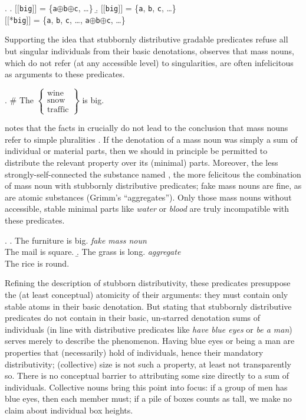 \documentclass[linguex]{sp}
\newcommand{\sem}[1]{\mbox{$[\![$#1$]\!]$}}
\renewcommand{\tt}{\texttt}
\newcommand{\op}{$\oplus$}
\begin{document}
\ex. \a. \sem{\tt{big}} = \{\tt{a}\op\tt{b}\op\tt{c}, \ldots\}
\b. \sem{\tt{big}} = \{\tt{a}, \tt{b}, \tt{c}, \ldots\}\\
\sem{*\tt{big}} = \{\tt{a}, \tt{b}, \tt{c}, \ldots, \tt{a}\op\tt{b}\op\tt{c}, \ldots\}

Supporting the idea that stubbornly distributive gradable predicates refuse all but singular individuals from their basic denotations, \cite{schwarzschild2011} observes that mass nouns, which do not refer (at any accessible level) to singularities, are often infelicitous as arguments to these predicates.

\ex. \# The $\left\{\begin{array}{l}\text{wine}\\ \text{snow}\\ \text{traffic}\end{array}\right\}$ is big.

\citeauthor{schwarzschild2011} notes that  the facts in \Last crucially do not lead to the conclusion that mass nouns refer to simple pluralities \citep[cf., e.g.,][]{chierchia1998mass}. If the denotation of a mass noun was simply a sum of individual or material parts, then we should in principle be permitted to distribute the relevant property over its (minimal) parts. Moreover, the less strongly-self-connected the substance named  \citep[in the sense of][]{grimm2012}, the more felicitous the combination of mass noun with stubbornly distributive predicates; fake mass nouns are fine, as are atomic substances (Grimm's ``aggregates''). Only those mass nouns without accessible, stable minimal parts like \emph{water} or \emph{blood} are truly incompatible with these predicates.

\ex. \a. The furniture is big. \hfill \emph{fake mass noun}\\
The mail is square.
\b. The grass is long. \hfill \emph{aggregate}\\
The rice is round.

Refining the description of stubborn distributivity, these predicates presuppose the (at least conceptual) atomicity of their arguments: they must contain only stable atoms in their basic denotation. But stating that stubbornly distributive predicates do not contain in their basic, un-starred denotation sums of individuals (in line with distributive predicates like \emph{have blue eyes} or \emph{be a man}) serves merely to describe the phenomenon. Having blue eyes or being a man are properties that (necessarily) hold of individuals, hence their mandatory distributivity; (collective) size is not such a property, at least not transparently so. There is no conceptual barrier to attributing some size directly to a sum of individuals. Collective nouns bring this point into focus: if a group of men has blue eyes, then each member must; if a pile of boxes counts as tall, we make no claim about individual box heights.
\end{document}

